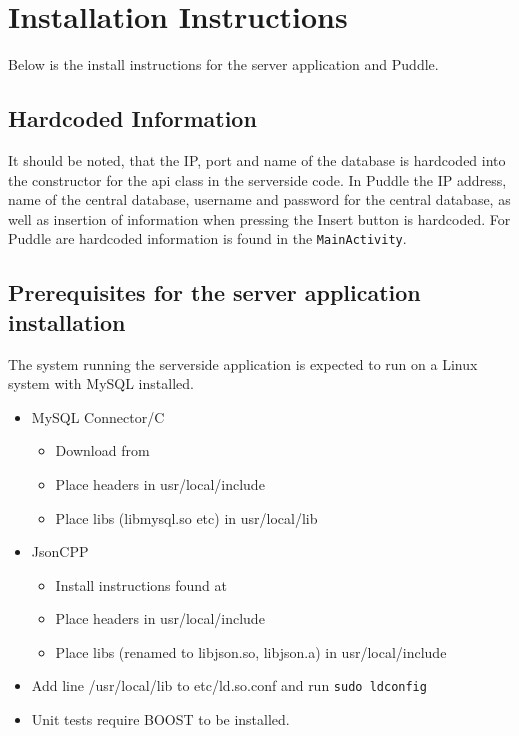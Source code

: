 \section{Installation Instructions}
Below is the install instructions for the server application and Puddle.

\subsection{Hardcoded Information}
It should be noted, that the IP, port and name of the database is hardcoded into the constructor for the \ac{api} class in the serverside code. In Puddle the IP address, name of the central database, username and password for the central database, as well as insertion of information when pressing the Insert button is hardcoded. For Puddle are hardcoded information is found in the \lstinline|MainActivity|.

\subsection{Prerequisites for the server application installation}
The system running the serverside application is expected to run on a Linux system with MySQL installed.

\begin{itemize}
\item MySQL Connector/C
\begin{itemize}
	\item Download from \cite{mysqlconnector}
	\item Place headers in usr/local/include
	\item Place libs (libmysql.so etc) in usr/local/lib
\end{itemize}
\item JsonCPP
\begin{itemize}
	\item Install instructions found at \citep{jsoncppinstall}
	\item Place headers in usr/local/include
	\item Place libs (renamed to libjson.so, libjson.a) in usr/local/include
\end{itemize}
\item Add line /usr/local/lib to etc/ld.so.conf and run \lstinline|sudo ldconfig|
\item Unit tests require BOOST to be installed.\citep{boostinstall}
\end{itemize}

